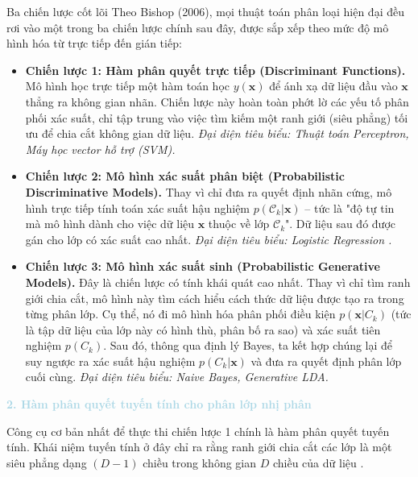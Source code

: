 \begin{infobox}{Ba chiến lược cốt lõi}
Theo Bishop (2006), mọi thuật toán phân loại hiện đại đều rơi vào một trong ba chiến lược chính sau đây, được sắp xếp theo mức độ mô hình hóa từ trực tiếp đến gián tiếp\cite{bishop2006pattern}:

\begin{itemize}
    \item \textbf{Chiến lược 1: Hàm phân quyết trực tiếp (Discriminant Functions).} 
    Mô hình học trực tiếp một hàm toán học $y(\mathbf{x})$ để ánh xạ dữ liệu đầu vào $\mathbf{x}$ thẳng ra không gian nhãn. Chiến lược này hoàn toàn phớt lờ các yếu tố phân phối xác suất, chỉ tập trung vào việc tìm kiếm một ranh giới (siêu phẳng) tối ưu để chia cắt không gian dữ liệu. \textit{Đại diện tiêu biểu: Thuật toán Perceptron, Máy học vector hỗ trợ (SVM).}
    
    \item \textbf{Chiến lược 2: Mô hình xác suất phân biệt (Probabilistic Discriminative Models).} 
    Thay vì chỉ đưa ra quyết định nhãn cứng, mô hình trực tiếp tính toán xác suất hậu nghiệm $p(\mathcal{C}_k | \mathbf{x})$ – tức là "độ tự tin mà mô hình dành cho việc dữ liệu $\mathbf{x}$ thuộc về lớp $\mathcal{C}_k$". Dữ liệu sau đó được gán cho lớp có xác suất cao nhất. \textit{Đại diện tiêu biểu: Logistic Regression \cite{goodfellow2016deep}.}
    
    \item \textbf{Chiến lược 3: Mô hình xác suất sinh (Probabilistic Generative Models).} 
    Đây là chiến lược có tính khái quát cao nhất. Thay vì chỉ tìm ranh giới chia cắt, mô hình này tìm cách hiểu cách thức dữ liệu được tạo ra trong từng phân lớp. Cụ thể, nó đi mô hình hóa phân phối điều kiện $p(\mathbf{x}|C_k)$ (tức là tập dữ liệu của lớp này có hình thù, phân bố ra sao) và xác suất tiên nghiệm $p(C_k)$. Sau đó, thông qua định lý Bayes, ta kết hợp chúng lại để suy ngược ra xác suất hậu nghiệm $p(C_k|\mathbf{x})$ và đưa ra quyết định phân lớp cuối cùng.
    \textit{Đại diện tiêu biểu: Naive Bayes, Generative LDA.}
\end{itemize}
\end{infobox}

\vspace{0.5em}
\noindent\textcolor{lightblue}{\textbf{2. Hàm phân quyết tuyến tính cho phân lớp nhị phân}}
\vspace{0.5em}

Công cụ cơ bản nhất để thực thi chiến lược 1 chính là hàm phân quyết tuyến tính. Khái niệm tuyến tính ở đây chỉ ra rằng ranh giới chia cắt các lớp là một siêu phẳng dạng $(D-1)$ chiều trong không gian $D$ chiều của dữ liệu \cite{bishop2006pattern}. 

